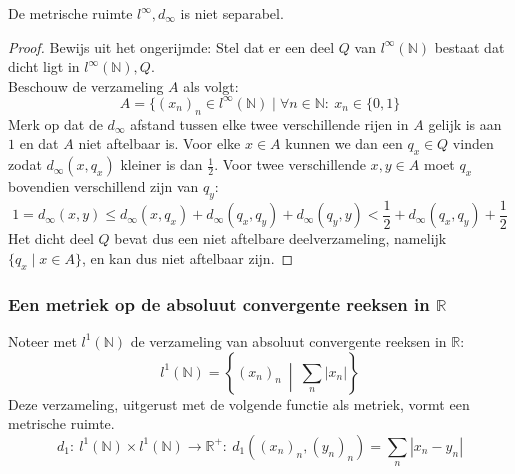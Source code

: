 \documentclass[main.tex]{subfiles}
\begin{document}
\begin{vb}
  De metrische ruimte $l^{\infty},d_{\infty}$ is niet separabel.
  
  \begin{proof}
    Bewijs uit het ongerijmde: Stel dat er een deel $Q$ van $l^{\infty}(\mathbb{N})$ bestaat dat dicht ligt in $l^{\infty}(\mathbb{N}),Q$.\\
    Beschouw de verzameling $A$ als volgt:
    \[ A = \{ (x_{n})_{n} \in l^{\infty}(\mathbb{N}) \mid \forall n\in \mathbb{N}:\ x_{n} \in \{0,1\} \]
    Merk op dat de $d_{\infty}$ afstand tussen elke twee verschillende rijen in $A$ gelijk is aan $1$ en dat $A$ niet aftelbaar is.\waarom
    Voor elke $x\in A$ kunnen we dan een $q_{x}\in Q$ vinden zodat $d_{\infty}(x,q_{x})$ kleiner is dan $\frac{1}{2}$.
    Voor twee verschillende $x,y\in A$ moet $q_{x}$ bovendien verschillend zijn van $q_{y}$:
    \[ 1 = d_{\infty}(x,y) \le d_{\infty}(x,q_{x}) + d_{\infty}(q_{x},q_{y}) + d_{\infty}(q_{y},y) < \frac{1}{2} + d_{\infty}(q_{x},q_{y}) + \frac{1}{2} \]
    Het dicht deel $Q$ bevat dus een niet aftelbare deelverzameling, namelijk $\{q_{x} \mid x\in A\}$, en kan dus niet aftelbaar zijn.
  \end{proof}
\end{vb}

\subsubsection{Een metriek op de absoluut convergente reeksen in $\mathbb{R}$}
\label{sec:een-metriek-op-2}

\begin{vb}
  Noteer met $l^{1}(\mathbb{N})$ de verzameling van absoluut convergente reeksen in $\mathbb{R}$:
  \[ l^{1}(\mathbb{N}) = \left\{ (x_{n})_{n} \ \middle|\ \sum_{n}|x_{n}| \right\} \]
  Deze verzameling, uitgerust met de volgende functie als metriek, vormt een metrische ruimte.
  \[ d_{1}:\ l^{1}(\mathbb{N}) \times l^{1}(\mathbb{N}) \rightarrow \mathbb{R}^{+}:\ d_{1}((x_{n})_{n},(y_{n})_{n}) = \sum_{n}|x_{n}-y_{n}| \]
\end{vb}
\end{document}

